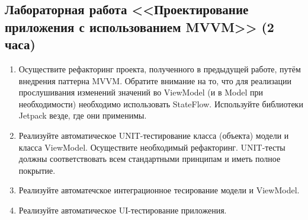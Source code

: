 \subsection{Лабораторная работа <<Проектирование приложения с использованием MVVM>> (2 часа)}
\begin{enumerate}
\item Осуществите рефакторинг проекта, полученного в предыдущей работе, путём внедрения паттерна MVVM. 
Обратите внимание на то, что для реализации прослушивания изменений значений во ViewModel 
(и в Model при необходимости) необходимо использовать StateFlow. 
Используйте библиотеки Jetpack везде, где они применимы.
\item Реализуйте автоматическое UNIT-тестирование класса (объекта) модели и класса ViewModel. 
Осуществите необходимый рефакторинг. UNIT-тесты должны соответствовать всем стандартными принципам и иметь полное покрытие.
\item Реализуйте автоматечское интеграционное тесирование модели и ViewModel.
\item Реализуйте автоматическое UI-тестирование приложения.
\end{enumerate}
